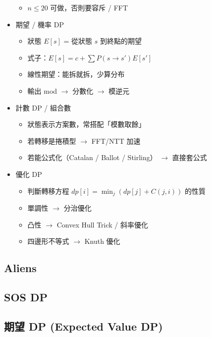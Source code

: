 \documentclass[a4paper,10pt,twocolumn,oneside]{article}
\begin{document}
\begin{itemize}[nolistsep]
\begin{itemize}[nolistsep]
            \item $n \le 20$ 可做，否則要容斥 / FFT  
        \end{itemize}
    \item 期望 / 機率 DP  
        \begin{itemize}[nolistsep]
            \item 狀態 $E[s]$ = 從狀態 $s$ 到終點的期望  
            \item 式子：$E[s] = c + \sum P(s \to s') E[s']$  
            \item 線性期望：能拆就拆，少算分布  
            \item 輸出 mod $\rightarrow$ 分數化 $\rightarrow$  模逆元  
        \end{itemize}
    \item 計數 DP / 組合數  
        \begin{itemize}[nolistsep]
            \item 狀態表示方案數，常搭配「模數取餘」  
            \item 若轉移是捲積型 $\rightarrow$ FFT/NTT 加速  
            \item 若能公式化（Catalan / Ballot / Stirling） $\rightarrow$ 直接套公式  
        \end{itemize}
    \item 優化 DP  
        \begin{itemize}[nolistsep]
            \item 判斷轉移方程 $dp[i] = \min_j (dp[j] + C(j,i))$ 的性質  
            \item 單調性 $\rightarrow$ 分治優化  
            \item 凸性 $\rightarrow$ Convex Hull Trick / 斜率優化  
            \item 四邊形不等式 $\rightarrow$ Knuth 優化  
        \end{itemize}
\end{itemize}

\subsection{Aliens}


\subsection{SOS DP}


\subsection{期望 DP (Expected Value DP)}
\end{document}
